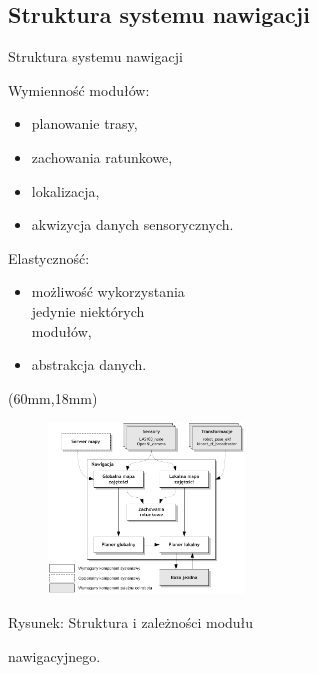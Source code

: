 \documentclass[xcolor=x11names,compress]{beamer}
\renewcommand{\(}{\begin{columns}}
\renewcommand{\)}{\end{columns}}
\newcommand{\<}[1]{\begin{column}{#1}}
\renewcommand{\>}{\end{column}}
\begin{document}
\subsection{Struktura systemu nawigacji}

\begin{frame}{Struktura systemu nawigacji}

\alert{Wymienność modułów:}
\begin{itemize}
\item planowanie trasy,
\item zachowania ratunkowe,
\item lokalizacja,
\item akwizycja danych sensorycznych.
\end{itemize}

\vspace{.5cm}

\alert{Elastyczność:}
\begin{itemize}
\item możliwość wykorzystania\\jedynie niektórych\\modułów,
\item abstrakcja danych.
\end{itemize}

\begin{textblock*}{70mm}(60mm,18mm)%
    \begin{minipage}[c]{70mm}%
	\begin{figure}[h!]
	\includegraphics[width=5.2cm]{../MSc/img/diag_move_base}
	\end{figure}
	\hspace{1cm}\scriptsize \alert{Rysunek:} Struktura i zależności modułu

	\hspace{1cm}nawigacyjnego.
    \end{minipage}
\end{textblock*}

\end{frame}
\end{document}
